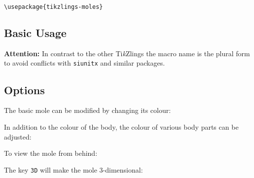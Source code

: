\documentclass[parskip=half]{scrartcl}
\newcommand{\tikzlings}{Ti\emph{k}Zlings\xspace}
\begin{document}
\begin{tcolorbox}[lower separated=false, lefthand width=.8\linewidth]
\vspace*{0.5cm}
\lstinline|\usepackage{tikzlings-moles}| 
\vspace*{0.5cm}
\end{tcolorbox}

\subsection{Basic Usage}

\textcolor{red!60!black}{\textbf{Attention:} In contrast to the other \tikzlings the macro name is the plural form to avoid conflicts with  \lstinline|siunitx| and similar packages.}
\begin{tcblisting}{}
\moles
\end{tcblisting}

\subsection{Options}

The basic mole can be modified by changing its colour:
\begin{tcblisting}{}
\moles[body=blue]
\end{tcblisting}

In addition to the colour of the body, the colour of various body parts can be adjusted:
\begin{tcblisting}{}
\moles[eye=red]
\end{tcblisting}

\begin{tcblisting}{}
\moles[muzzle=red]
\end{tcblisting}

\begin{tcblisting}{}
\moles[hands=red]
\end{tcblisting}

\begin{tcblisting}{}
\moles[feet=red]
\end{tcblisting}

To view the mole from behind:
\begin{tcblisting}{}
\moles[back]
\end{tcblisting}

The key \lstinline|3D| will make the mole 3-dimensional:
\begin{tcblisting}{}
\moles[3D]
\end{tcblisting}
\end{document}
